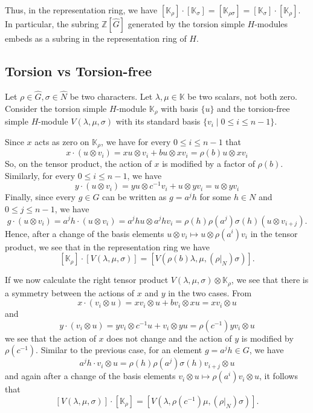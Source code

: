 \documentclass[11pt, twoside]{amsart}
\theoremstyle{definition}
\begin{document}
Thus, in the representation ring, we have $[\mathbb{K}_\rho]\cdot [\mathbb{K}_\sigma] = [\mathbb{K}_{\rho\sigma}] = [\mathbb{K}_\sigma]\cdot [\mathbb{K}_\rho]$. In particular, the subring $\mathbb{Z}[\widehat{G}]$ generated by the torsion simple $H$-modules embeds as a subring in the representation ring of $H$. 

\subsection{Torsion vs Torsion-free}
%
Let $\rho \in \widehat{G}, \sigma\in\widehat{N}$ be two characters. Let $\lambda, \mu \in \mathbb{K}$ be two scalars, not both zero. Consider the torsion simple $H$-module $\mathbb{K}_\rho$ with basis $\{u\}$ and the torsion-free simple $H$-module $V (\lambda, \mu, \sigma)$ with its standard basis $\{v_i \mid 0 \leq i \leq n-1 \}$. 

Since $x$ acts as zero on $\mathbb{K}_\rho$, we have for every $0 \leq i \leq n-1$ that
%
\[x\cdot (u \otimes v_i) = xu \otimes v_i + bu \otimes xv_i = \rho(b)u\otimes xv_i\]
%
So, on the tensor product, the action of $x$ is modified by a factor of $\rho(b)$. Similarly, for every $0 \leq i \leq n-1$, we have
%
\[y\cdot (u \otimes v_i) = yu \otimes c^{-1}v_i + u \otimes yv_i = u \otimes yv_i\]
%
Finally, since every $g \in G$ can be written as $g = a^j h$ for some $h \in N$ and $0 \leq j \leq n-1$, we have
%
\[g \cdot (u \otimes v_i) = a^j h \cdot (u \otimes v_i) = a^j hu \otimes a^j hv_i = \rho(h)\rho(a^j) \sigma(h)(u \otimes v_{i+j}).\]
%
Hence, after a change of the basis elements $u \otimes v_i \mapsto u \otimes \rho(a^i)v_i$ in the tensor product, we see that in the representation ring we have
%
\[[\mathbb{K}_\rho]\cdot [V(\lambda, \mu, \sigma)] = [V(\rho(b)\lambda, \mu, (\rho|_N) \sigma)].\]

If we now calculate the right tensor product $V (\lambda, \mu, \sigma) \otimes \mathbb{K}_\rho$, we see that there is a symmetry between the actions of $x$ and $y$ in the two cases. From 
%
\[x\cdot (v_i \otimes u) = xv_i \otimes u + bv_i \otimes xu = xv_i \otimes u\]
%
and
%
\[y\cdot (v_i \otimes u) = yv_i \otimes c^{-1}u + v_i \otimes yu = \rho(c^{-1})yv_i \otimes u\]
%
we see that the action of $x$ does not change and the action of $y$ is modified by $\rho(c^{-1})$. Similar to the previous case, for an element $g = a^j h \in G$, we have
%
\[a^j h \cdot v_i \otimes u=\rho(h)\rho(a^j)\sigma(h)v_{i+j} \otimes u\]
%
and again after a change of the basis elements $v_i \otimes u \mapsto \rho(a^i)v_i \otimes u$, it follows that
%
\[[V(\lambda, \mu, \sigma)]\cdot [\mathbb{K}_\rho] = [V(\lambda, \rho(c^{-1})\mu, (\rho|_N)\sigma)].\]
%
\end{document}
